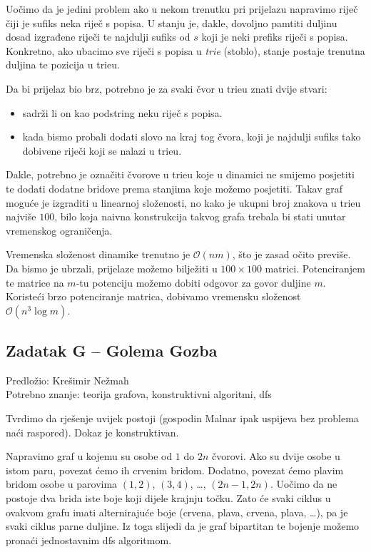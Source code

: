 \documentclass[a4paper]{article}
\begin{document}
Uočimo da je jedini problem ako u nekom trenutku pri prijelazu napravimo riječ
čiji je sufiks neka riječ s popisa. U stanju je, dakle, dovoljno pamtiti duljinu
dosad izgrađene riječi te najdulji sufiks od $s$ koji je neki prefiks riječi s
popisa. Konkretno, ako ubacimo sve riječi s popisa u \textit{trie} (stoblo),
stanje postaje trenutna duljina te pozicija u trieu.

Da bi prijelaz bio brz, potrebno je za svaki čvor u trieu znati dvije stvari:
\begin{itemize}
    \item sadrži li on kao podstring neku riječ s popisa.
    \item kada bismo probali dodati slovo na kraj tog čvora, koji je najdulji
          sufiks tako dobivene riječi koji se nalazi u trieu.
\end{itemize}

Dakle, potrebno je označiti čvorove u trieu koje u dinamici ne smijemo posjetiti
te dodati dodatne bridove prema stanjima koje možemo posjetiti. Takav graf
moguće je izgraditi u linearnoj složenosti, no kako je ukupni broj znakova u
trieu najviše $100$, bilo koja naivna konstrukcija takvog grafa trebala bi stati
unutar vremenskog ograničenja.

Vremenska složenost dinamike trenutno je $\mathcal{O}(nm)$, što je zasad očito
previše. Da bismo je ubrzali, prijelaze možemo bilježiti u $100\times100$ matrici.
Potenciranjem te matrice na $m$-tu potenciju možemo dobiti odgovor za govor
duljine $m$. Koristeći brzo potenciranje matrica, dobivamo vremensku složenost
$\mathcal{O}(n^3 \log{} m)$.

\subsection*{Zadatak G -- Golema Gozba}
\textsf{Predložio: Krešimir Nežmah}\\
\textsf{Potrebno znanje: teorija grafova, konstruktivni algoritmi, dfs}

Tvrdimo da rješenje uvijek postoji (gospodin Malnar ipak uspijeva bez problema
naći raspored). Dokaz je konstruktivan.

Napravimo graf u kojemu su osobe od $1$ do $2n$ čvorovi. Ako su dvije osobe u
istom paru, povezat ćemo ih crvenim bridom. Dodatno, povezat ćemo plavim bridom
osobe u parovima $(1, 2)$, $(3, 4)$, \dots, $(2n-1, 2n)$. Uočimo da ne postoje
dva brida iste boje koji dijele krajnju točku. Zato će svaki ciklus u ovakvom
grafu imati alternirajuće boje (crvena, plava, crvena, plava, \dots), pa je
svaki ciklus parne duljine. Iz toga slijedi da je graf bipartitan te bojenje
možemo pronaći jednostavnim dfs algoritmom.
\end{document}
